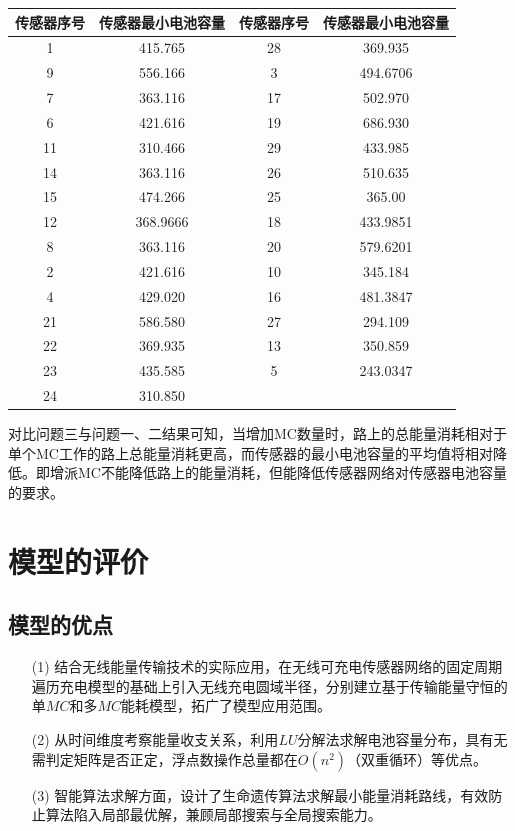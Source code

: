 \documentclass{whutmod}
\begin{document}
\begin{table}[H]
\begin{tablenotes}
\begin{table}[H]
  	\begin{tabular}{cccc}
  		\toprule[2pt]
  		\multicolumn{1}{m{2.5cm}}{\centering 传感器序号}
  		& \multicolumn{1}{m{4.5cm}}{\centering 传感器最小电池容量}& \multicolumn{1}{m{2.5cm}}{\centering 传感器序号}& \multicolumn{1}{m{4.5cm}}{\centering 传感器最小电池容量}
  		\\
  		\midrule[1pt]
  		1 &   415.765 & 28&369.935\\ 
  		9&   556.166& 3&494.6706\\ 
  		7&   363.116& 17&502.970\\ 
  		6 &   421.616& 19&686.930\\ 
  		11 &   310.466 & 29&433.985\\ 
  		14&   363.116& 26&510.635\\ 
  		15 &  474.266& 25&365.00\\ 
  		12&  368.9666& 18&433.9851\\ 
  		8&  363.116& 20&579.6201\\ 
  		2 &  421.616& 10&345.184\\ 
  		4&  429.020& 16&481.3847\\ 
  		21&  586.580& 27&294.109 \\ 
  		22 &  369.935& 13&350.859\\ 
  		23 & 435.585& 5&243.0347\\ 
  		24 & 310.850& &\\
  		\bottomrule[2pt]	
  	\end{tabular}
  \end{table}
  对比问题三与问题一、二结果可知，当增加MC数量时，路上的总能量消耗相对于单个MC工作的路上总能量消耗更高，而传感器的最小电池容量的平均值将相对降低。即增派MC不能降低路上的能量消耗，但能降低传感器网络对传感器电池容量的要求。
 
  	\section{模型的评价}
		\subsection{模型的优点}
			\begin{itemize}                                             
			\item [(1)]结合无线能量传输技术的实际应用，在无线可充电传感器网络的固定周期遍历充电模型的基础上引入无线充电圆域半径，分别建立基于传输能量守恒的单$MC$和多$MC$能耗模型，拓广了模型应用范围。
			\item [(2)]从时间维度考察能量收支关系，利用$LU$分解法求解电池容量分布，具有无需判定矩阵是否正定，浮点数操作总量都在$O(n^2)$（双重循环）等优点。 
			\item [(3)]智能算法求解方面，设计了生命遗传算法求解最小能量消耗路线，有效防止算法陷入局部最优解，兼顾局部搜索与全局搜索能力。
			\end{itemize}

\end{tablenotes}
\end{table}
\end{document}
